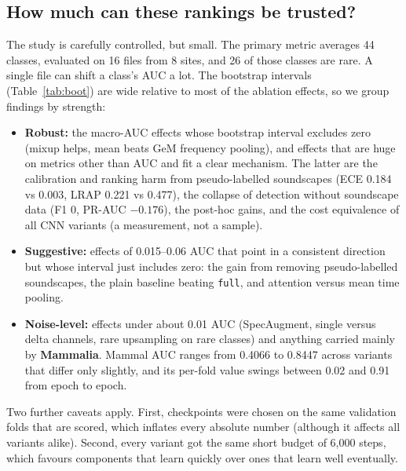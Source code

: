 \documentclass[11pt]{article}
\newcommand{\var}[1]{\texttt{#1}}
\begin{document}
\subsection{How much can these rankings be trusted?}
The study is carefully controlled, but small. The primary metric averages 44
classes, evaluated on 16 files from 8 sites, and 26 of those classes are rare.
A single file can shift a class's AUC a lot. The bootstrap intervals
(Table~\ref{tab:boot}) are wide relative to most of the ablation effects, so
we group findings by strength:
\begin{itemize}
  \item \textbf{Robust:} the macro-AUC effects whose bootstrap interval
        excludes zero (mixup helps, mean beats GeM frequency pooling), and
        effects that are huge on metrics other than AUC and fit a clear
        mechanism. The latter are the calibration and ranking harm from
        pseudo-labelled soundscapes (ECE 0.184 vs 0.003, LRAP 0.221 vs
        0.477), the collapse of detection without soundscape data (F1 0,
        PR-AUC $-0.176$), the post-hoc gains, and the cost equivalence of all
        CNN variants (a measurement, not a sample).
  \item \textbf{Suggestive:} effects of 0.015--0.06 AUC that point in a
        consistent direction but whose interval just includes zero: the gain
        from removing pseudo-labelled soundscapes, the plain baseline beating
        \var{full}, and attention versus mean time pooling.
  \item \textbf{Noise-level:} effects under about 0.01 AUC (SpecAugment,
        single versus delta channels, rare upsampling on rare classes) and
        anything carried mainly by \textbf{Mammalia}. Mammal AUC ranges from
        0.4066 to 0.8447 across variants that differ only slightly, and its
        per-fold value swings between 0.02 and 0.91 from epoch to epoch.
\end{itemize}
Two further caveats apply. First, checkpoints were chosen on the same
validation folds that are scored, which inflates every absolute number
(although it affects all variants alike). Second, every variant got the same
short budget of 6{,}000 steps, which favours components that learn quickly
over ones that learn well eventually.
\end{document}
